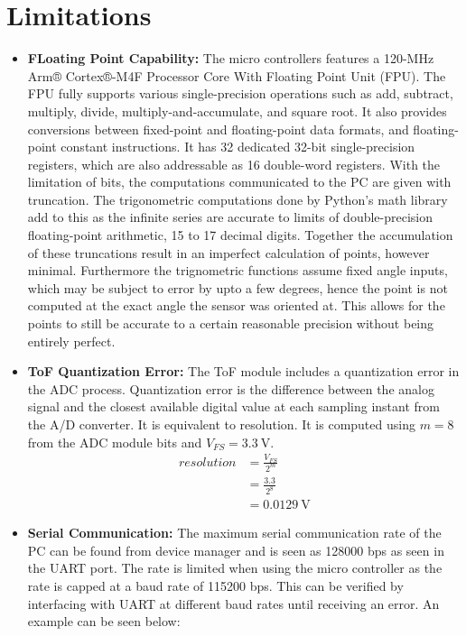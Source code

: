 \documentclass[12pt, letterpaper]{article}
\begin{document}
\section{Limitations}
\begin{itemize}
    \item \textbf{FLoating Point Capability: }The micro controllers features a 120-MHz Arm® Cortex®-M4F Processor Core With Floating Point Unit (FPU). The FPU fully supports various single-precision operations such as add, subtract, multiply, divide, multiply-and-accumulate, and square root. It also provides conversions between fixed-point and floating-point data formats, and floating-point constant instructions. It has 32 dedicated 32-bit single-precision registers, which are also addressable as 16 double-word registers. With the limitation of bits, the computations communicated to the PC are given with truncation. The trigonometric computations done by Python's math library add to this as the infinite series are accurate to limits of double-precision floating-point arithmetic, 15 to 17 decimal digits. Together the accumulation of these truncations result in an imperfect calculation of points, however minimal. Furthermore the trignometric functions assume fixed angle inputs, which may be subject to error by upto a few degrees, hence the point is not computed at the exact angle the sensor was oriented at. This allows for the points to still be accurate to a certain reasonable precision without being entirely perfect. 
    \item \textbf{ToF Quantization Error: } The ToF module includes a quantization error in the ADC process. Quantization error is the difference between the analog signal and the closest available digital value at each sampling instant from the A/D converter. It is equivalent to resolution. It is computed using $m = 8$ from  the ADC module bits and $V_{FS} = 3.3\ \text{V}$.
    \begin{align*}
        resolution &= \frac{V_{FS}}{2^m} \\
                   &= \frac{3.3}{2^8} \\
                   &= 0.0129\ \text{V}
    \end{align*}
    \item \textbf{Serial Communication: } The maximum serial communication rate of the PC can be found from device manager and is seen as 128000 bps as seen in the UART port. The rate is limited when using the micro controller as the rate is capped at a baud rate of 115200 bps. This can be verified by interfacing with UART at different baud rates until receiving an error. An example can be seen below: 


\end{itemize}
\end{document}
